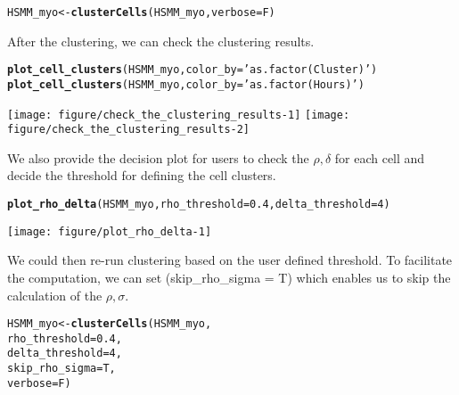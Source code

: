 \documentclass[10pt,oneside]{article}\usepackage[]{graphicx}\usepackage[]{color}
\makeatletter
\def\maxwidth{ %
  \ifdim\Gin@nat@width>\linewidth
    \linewidth
  \else
    \Gin@nat@width
  \fi
}
\newcommand{\hlnum}[1]{\textcolor[rgb]{0.686,0.059,0.569}{#1}}%
\newcommand{\hlstr}[1]{\textcolor[rgb]{0.192,0.494,0.8}{#1}}%
\newcommand{\hlstd}[1]{\textcolor[rgb]{0.345,0.345,0.345}{#1}}%
\newcommand{\hlkwb}[1]{\textcolor[rgb]{0.69,0.353,0.396}{#1}}%
\newcommand{\hlkwc}[1]{\textcolor[rgb]{0.333,0.667,0.333}{#1}}%
\newcommand{\hlkwd}[1]{\textcolor[rgb]{0.737,0.353,0.396}{\textbf{#1}}}%
\newenvironment{kframe}{%
 \def\at@end@of@kframe{}%
 \ifinner\ifhmode%
  \def\at@end@of@kframe{\end{minipage}}%
  \begin{minipage}{\columnwidth}%
 \fi\fi%
 \def\FrameCommand##1{\hskip\@totalleftmargin \hskip-\fboxsep
 \colorbox{shadecolor}{##1}\hskip-\fboxsep
     \hskip-\linewidth \hskip-\@totalleftmargin \hskip\columnwidth}%
 \MakeFramed {\advance\hsize-\width
   \@totalleftmargin\z@ \linewidth\hsize
   \@setminipage}}%
 {\par\unskip\endMakeFramed%
 \at@end@of@kframe}
\newenvironment{knitrout}{}{} %
\makeatother
\begin{document}
\begin{knitrout}
\color{fgcolor}\begin{kframe}
\begin{alltt}
\hlstd{HSMM_myo} \hlkwb{<-} \hlkwd{clusterCells}\hlstd{(HSMM_myo,} \hlkwc{verbose} \hlstd{= F)}
\end{alltt}
\end{kframe}
\end{knitrout}

After the clustering, we can check the clustering results. 
\begin{knitrout}
\color{fgcolor}\begin{kframe}
\begin{alltt}
\hlkwd{plot_cell_clusters}\hlstd{(HSMM_myo,} \hlkwc{color_by} \hlstd{=} \hlstr{'as.factor(Cluster)'}\hlstd{)}
\hlkwd{plot_cell_clusters}\hlstd{(HSMM_myo,} \hlkwc{color_by} \hlstd{=} \hlstr{'as.factor(Hours)'}\hlstd{)}
\end{alltt}
\end{kframe}
\texttt{[image: figure/check\_the\_clustering\_results-1]} 
\texttt{[image: figure/check\_the\_clustering\_results-2]} 

\end{knitrout}

We also provide the decision plot for users to check the $\rho, \delta$ for each cell and decide the threshold for defining the cell clusters. 
\begin{knitrout}
\color{fgcolor}\begin{kframe}
\begin{alltt}
\hlkwd{plot_rho_delta}\hlstd{(HSMM_myo,} \hlkwc{rho_threshold} \hlstd{=} \hlnum{0.4}\hlstd{,} \hlkwc{delta_threshold} \hlstd{=} \hlnum{4} \hlstd{)}
\end{alltt}
\end{kframe}

{\centering \texttt{[image: figure/plot\_rho\_delta-1]} 

}



\end{knitrout}

We could then re-run clustering based on the user defined threshold. To 
facilitate the computation, we can set \Rfunction(skip\_rho\_sigma = T) 
which enables us to skip the calculation of the $\rho, \sigma$.  
\begin{knitrout}
\color{fgcolor}\begin{kframe}
\begin{alltt}
\hlstd{HSMM_myo} \hlkwb{<-} \hlkwd{clusterCells}\hlstd{(HSMM_myo,}
                         \hlkwc{rho_threshold} \hlstd{=} \hlnum{0.4}\hlstd{,}
                         \hlkwc{delta_threshold} \hlstd{=} \hlnum{4}\hlstd{,}
                         \hlkwc{skip_rho_sigma} \hlstd{= T,}
                         \hlkwc{verbose} \hlstd{= F)}
\end{alltt}
\end{kframe}
\end{knitrout}
\end{document}
